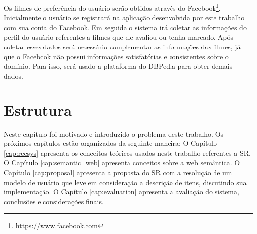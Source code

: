 Os filmes de preferência do usuário serão obtidos através do Facebook\footnote{https://www.facebook.com}. Inicialmente o usuário se registrará na aplicação desenvolvida por este trabalho com sua conta do Facebook. Em seguida o sistema irá coletar as informações do perfil do usuário referentes a filmes que ele avaliou ou tenha marcado. Após coletar esses dados será necessário complementar as informações dos filmes, já que o Facebook não possui informações satisfatórias e consistentes sobre o domínio. Para isso, será usado a plataforma do DBPedia para obter demais dados.

\section{Estrutura}
Neste capítulo foi motivado e introduzido o problema deste trabalho. Os próximos capítulos estão organizados da seguinte maneira: O Capítulo \ref{cap:recsys} apresenta os conceitos teóricos usados neste trabalho referentes a SR. O Capítulo \ref{cap:semantic_web} apresenta conceitos sobre a web semântica. O Capítulo \ref{cap:proposal} apresenta a proposta do SR com a resolução de um modelo de usuário que leve em consideração a descrição de itens, discutindo sua implementação. O Capítulo \ref{cap:evaluation} apresenta a avaliação do sistema, conclusões e considerações finais.